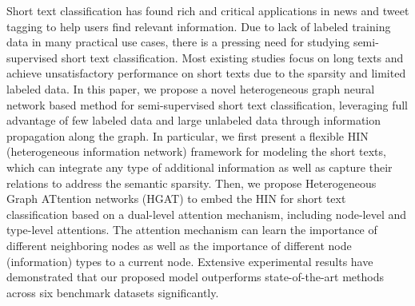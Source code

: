 Short text classification has found rich and critical applications in news and tweet tagging to help users find relevant information. Due to lack of labeled training data in many practical use cases, there is a pressing need for studying semi-supervised short text classification. Most existing studies focus on long texts and achieve unsatisfactory performance on short texts due to the sparsity and limited labeled data. In this paper, we propose a novel heterogeneous graph neural network based method for semi-supervised short text classification, leveraging full advantage of few labeled data and large unlabeled data through information propagation along the graph. In particular, we first present a flexible HIN (heterogeneous information network) framework for modeling the short texts, which can integrate any type of additional information as well as capture their relations to address the semantic sparsity. Then, we propose  Heterogeneous Graph ATtention networks (HGAT) to embed the HIN for short text classification based on a  dual-level attention mechanism, including node-level and type-level attentions. The attention mechanism can learn the importance of different neighboring nodes as well as the importance of different node (information) types  to a current node. Extensive experimental results have demonstrated that our proposed model outperforms  state-of-the-art methods across six benchmark datasets significantly.